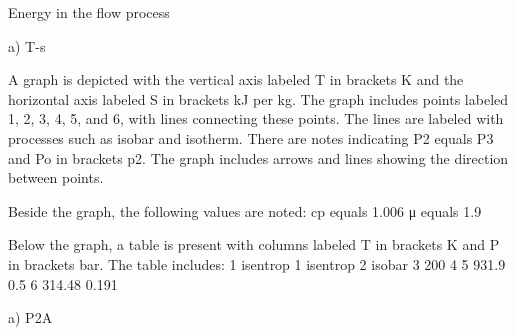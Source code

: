 Energy in the flow process

a) T-s

A graph is depicted with the vertical axis labeled T in brackets K and the horizontal axis labeled S in brackets kJ per kg. The graph includes points labeled 1, 2, 3, 4, 5, and 6, with lines connecting these points. The lines are labeled with processes such as isobar and isotherm. There are notes indicating P2 equals P3 and Po in brackets p2. The graph includes arrows and lines showing the direction between points.

Beside the graph, the following values are noted:
cp equals 1.006
μ equals 1.9

Below the graph, a table is present with columns labeled T in brackets K and P in brackets bar. The table includes:
1 isentrop
1 isentrop
2 isobar
3 200
4
5 931.9 0.5
6 314.48 0.191

a) P2A